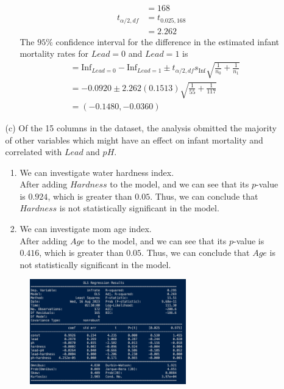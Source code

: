 \documentclass{uofa-eng-assignment}
\begin{document}
\begin{enumerate}
\begin{enumerate}
\begin{enumerate}
\begin{align*}
                                                 & = 168            \\
                              t_{\alpha / 2, df} & = t_{0.025, 168} \\
                                                 & = 2.262
                          \end{align*}
                          The $95\%$ confidence interval for the difference in the estimated infant mortality rates for $Lead = 0$ and $Lead = 1$ is
                          \begin{align*}
                               & = \text{Inf}_{Lead = 0} - \text{Inf}_{Lead = 1} \pm t_{\alpha / 2, df}s_{\text{Inf}}\sqrt{\frac{1}{n_0} + \frac{1}{n_1}} \\
                               & = -0.0920 \pm 2.262(0.1513)\sqrt{\frac{1}{55} + \frac{1}{117}}                                                           \\
                               & = (-0.1480, -0.0360)
                          \end{align*}
                \end{enumerate}
            \item[(c)] Of the 15 columns in the dataset, the analysis obmitted the majority of other variables
                which might have an effect on infant mortality and correlated with $Lead$ and $pH$.
                \begin{enumerate}
                    \item We can investigate water hardness index. \\ After adding $Hardness$ to the
                          model, and we can see that its $p$-value is $0.924$, which is greater than
                          $0.05$. Thus, we can conclude that $Hardness$ is not statistically significant
                          in the model.
                    \item We can investigate mom age index. \\ After adding $Age$ to the model, and we
                          can see that its $p$-value is $0.416$, which is greater than $0.05$. Thus, we
                          can conclude that $Age$ is not statistically significant in the model.
                \end{enumerate}
                \begin{figure}[h]
                    \centering
                    \includegraphics[width=0.68\textwidth]{p1-c-i.png}

\end{figure}
\end{enumerate}
\end{enumerate}
\end{document}
